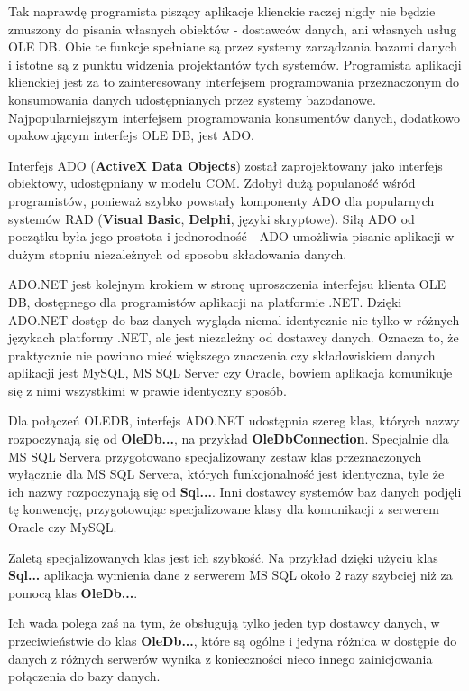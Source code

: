 Tak naprawdę programista piszący aplikacje klienckie raczej nigdy nie będzie zmuszony do pisania
własnych obiektów - dostawców danych, ani własnych usług OLE DB. Obie te funkcje
spełniane są przez systemy zarządzania bazami danych i istotne są z punktu widzenia projektantów
tych systemów. Programista aplikacji klienckiej jest za to zainteresowany interfejsem programowania
przeznaczonym do konsumowania danych udostępnianych przez systemy bazodanowe. Najpopularniejszym
interfejsem programowania konsumentów danych, dodatkowo opakowującym interfejs OLE DB, jest ADO.

Interfejs ADO ({\bf ActiveX Data Objects}) został zaprojektowany jako interfejs obiektowy,
udostępniany w modelu COM. Zdobył dużą populaność wśród programistów, ponieważ szybko powstały
komponenty ADO dla popularnych systemów RAD ({\bf Visual Basic}, {\bf Delphi}, języki skryptowe).
Siłą ADO od początku była jego prostota i jednorodność - ADO umożliwia pisanie aplikacji
w dużym stopniu niezależnych od sposobu składowania danych.

ADO.NET jest kolejnym krokiem w stronę uproszczenia interfejsu klienta OLE DB, dostępnego
dla programistów aplikacji na platformie .NET. Dzięki ADO.NET dostęp do baz danych wygląda niemal
identycznie nie tylko w różnych językach platformy .NET, ale jest niezależny od dostawcy danych.
Oznacza to, że praktycznie nie powinno mieć większego znaczenia czy składowiskiem danych aplikacji
jest MySQL, MS SQL Server czy Oracle, bowiem aplikacja komunikuje się z nimi wszystkimi w prawie 
identyczny sposób.

Dla połączeń OLEDB, interfejs ADO.NET udostępnia szereg klas, których nazwy rozpoczynają się od {\bf OleDb...},
na przykład {\bf OleDbConnection}. Specjalnie dla MS SQL Servera przygotowano specjalizowany
zestaw klas przeznaczonych wyłącznie dla MS SQL Servera, których funkcjonalność jest
identyczna, tyle że ich nazwy rozpoczynają się od {\bf Sql...}. Inni dostawcy systemów baz danych
podjęli tę konwencję, przygotowując specjalizowane klasy dla komunikacji z serwerem Oracle czy MySQL.

Zaletą specjalizowanych klas jest ich szybkość. Na przykład dzięki użyciu klas {\bf Sql...} aplikacja
wymienia dane z serwerem MS SQL około 2 razy szybciej niż za pomocą klas {\bf OleDb...}. 

Ich wada polega
zaś na tym, że obsługują tylko jeden typ dostawcy danych, w przeciwieństwie do klas {\bf OleDb...}, które
są ogólne i jedyna różnica w dostępie do danych z różnych serwerów wynika z konieczności
nieco innego zainicjowania połączenia do bazy danych.

